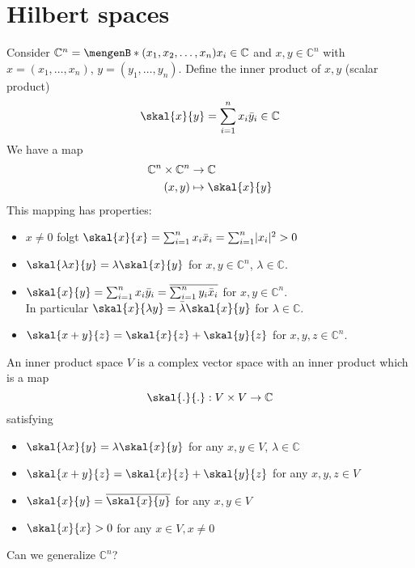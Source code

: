 
\newpage
\section{Hilbert spaces} 
\label{sec:hilbert_spaces}
\begin{beispiel}
	Consider $\mathbb{C}^n = \set[(x_1,x_2,\dots,x_n)]{x_i \in \mathbb{C}}$ and $x,y \in \mathbb{C}^n$ with
	$x= (x_1,\dots,x_n)$, $y = (y_1,\dots,y_n)$. Define the inner product of $x,y$ (scalar product)
	\[
		\skal{x}{y} = \sum^{n}_{i=1}x_i \bar{y}_i \in \mathbb{C}
	\]
	We have a map
	\begin{align*}
		\mathbb{C}^n \times \mathbb{C}^n &\to \mathbb{C} \\
		(x,y) &\mapsto \skal{x}{y}
	\end{align*}
	This mapping has properties:
	\begin{itemize}
		\item $x \neq 0$ folgt $\skal{x}{x} = \sum^{n}_{i=1}x_i \bar{x}_i = \sum^{n}_{i=1} \abs{x_i}^2 >0$
		\item $\skal{\lambda x}{y} = \lambda \skal{x}{y}$ for $x,y \in \mathbb{C}^n$, $\lambda \in \mathbb{C}$.
		\item $\skal{x}{y} = \sum^{n}_{i=1} x_i \bar{y}_i = \overline{\sum^{n}_{i=1}y_i \bar{x}_i}$ for $x,y \in \mathbb{C}^n$. \\
		In particular $\skal{x}{\lambda y} = \bar{\lambda} \skal{x}{y}$ for $\lambda \in \mathbb{C}$.
		\item $\skal{x+y}{z} = \skal{x}{z}+ \skal{y}{z}$ for $x,y,z \in \mathbb{C}^n$. 
	\end{itemize}
\end{beispiel}
\begin{definition*}
	An inner product space $V$ is a complex vector space with an inner product which is a map 
	\[
		\skal{.}{.}: V \times V \to \mathbb{C}
	\]
	satisfying
	\begin{itemize}
		\item $\skal{\lambda x}{y} = \lambda \skal{x}{y}$ for any $x,y \in V$, $\lambda \in \mathbb{C}$
		\item $\skal{x+y}{z} = \skal{x}{z}+ \skal{y}{z}$ for any $x,y,z \in V$
		\item $\skal{x}{y} = \overline{\skal{x}{y}}$ for any $x,y \in V$
		\item $\skal{x}{x}>0$ for any $x \in V, x \neq 0$
	\end{itemize}
\end{definition*}
Can we generalize $\mathbb{C}^n$? \\
